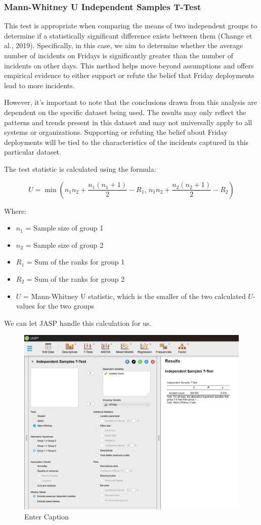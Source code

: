 \documentclass{article}
\begin{document}
\subsubsection{Mann-Whitney U Independent Samples T-Test}

This test is appropriate when comparing the means of two independent groups to determine if a statistically significant difference exists between them (Change et al., 2019). Specifically, in this case, we aim to determine whether the average number of incidents on Fridays is significantly greater than the number of incidents on other days. This method helps move beyond assumptions and offers empirical evidence to either support or refute the belief that Friday deployments lead to more incidents.

 However, it’s important to note that the conclusions drawn from this analysis are dependent on the specific dataset being used. The results may only reflect the patterns and trends present in this dataset and may not universally apply to all systems or organizations. Supporting or refuting the belief about Friday deployments will be tied to the characteristics of the incidents captured in this particular dataset.

 The test statistic is calculated using the formula:

 
\begin{equation}
U = \min \left( n_1 n_2 + \frac{n_1 (n_1 + 1)}{2} - R_1, \, n_1 n_2 + \frac{n_2 (n_2 + 1)}{2} - R_2 \right)
\end{equation}

Where:
\begin{itemize}
    \item $n_1$ = Sample size of group 1
    \item $n_2$ = Sample size of group 2
    \item $R_1$ = Sum of the ranks for group 1
    \item $R_2$ = Sum of the ranks for group 2
    \item $U$ = Mann-Whitney U statistic, which is the smaller of the two calculated \( U \)-values for the two groups
\end{itemize}

We can let JASP handle this calculation for us.

\begin{figure}[H]
    \centering
    \includegraphics[width=0.7\linewidth]{resources/Screenshot 2024-09-28 011601.png}
    \caption{Enter Caption}
    \label{fig:enter-label}
\end{figure}
\end{document}
